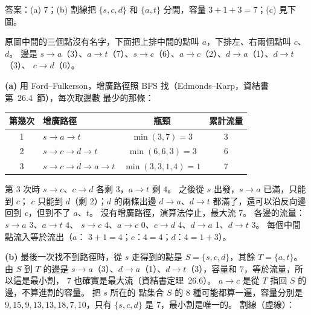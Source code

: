 \begin{pastsoln}
答案：(a) $7$；(b) 割線把 $\{s, c, d\}$ 和 $\{a, t\}$ 分開，容量 $3 + 1 + 3 = 7$；(c) 見下圖。

原圖中間的三個點沒有名字，下面把上排中間的點叫 $a$，下排左、右兩個點叫 $c$、$d$。 邊是
$s \to a$（3）、$a \to t$（7）、$s \to c$（6）、$a \to c$（2）、$d \to a$（1）、$d \to t$（3）、
$c \to d$（6）。

\textbf{(a)} 用 Ford--Fulkerson，增廣路徑照 BFS 找（Edmonds--Karp，資結書第~26.4~節），每次取邊數
最少的那條：
\begin{center}
\begin{tabular}{clcc}
\toprule
第幾次 & 增廣路徑 & 瓶頸 & 累計流量 \\
\midrule
1 & $s \to a \to t$ & $\min(3, 7) = 3$ & 3 \\
2 & $s \to c \to d \to t$ & $\min(6, 6, 3) = 3$ & 6 \\
3 & $s \to c \to d \to a \to t$ & $\min(3, 3, 1, 4) = 1$ & 7 \\
\bottomrule
\end{tabular}
\end{center}
第 3 次時 $s \to c$、$c \to d$ 各剩 $3$，$a \to t$ 剩 $4$。 之後從 $s$ 出發，$s \to a$ 已滿，只能到 $c$；
$c$ 只能到 $d$（剩 $2$）；$d$ 的兩條出邊 $d \to a$、$d \to t$ 都滿了，還可以沿反向邊回到 $c$，但到不了
$a$、$t$。 沒有增廣路徑，演算法停止，最大流 $7$。 各邊的流量：$s \to a$ 3、$a \to t$ 4、
$s \to c$ 4、$a \to c$ 0、$c \to d$ 4、$d \to a$ 1、$d \to t$ 3。 每個中間點流入等於流出（$a$：
$3 + 1 = 4$；$c$：$4 = 4$；$d$：$4 = 1 + 3$）。

\textbf{(b)} 最後一次找不到路徑時，從 $s$ 走得到的點是 $S = \{s, c, d\}$，其餘 $T = \{a, t\}$。 由 $S$
到 $T$ 的邊是 $s \to a$（3）、$d \to a$（1）、$d \to t$（3），容量和 $7$，等於流量，所以這是最小割，
$7$ 也確實是最大流（資結書定理~26.6）。 $a \to c$ 是從 $T$ 指回 $S$ 的邊，不算進割的容量。 把 $s$ 所在的
點集合 $S$ 的 $8$ 種可能都算一遍，容量分別是 $9, 15, 9, 13, 13, 18, 7, 10$，只有 $\{s, c, d\}$ 是
$7$，最小割是唯一的。 割線（虛線）：
\begin{center}
\end{center}


\end{pastsoln}
